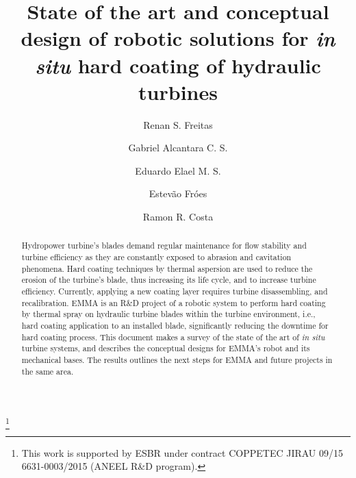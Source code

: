 \documentclass[twocolumn]{svjour3}
\begin{document}

\title{State of the art and conceptual design of robotic solutions for
\textit{in situ} hard coating of hydraulic turbines}%



\author{Renan S. Freitas \and
		Gabriel Alcantara C. S. \and
		Eduardo Elael M. S. \and
		Estevão Fróes \and
		Ramon R. Costa}


\thanks{This work is supported by ESBR under contract COPPETEC
JIRAU 09/15 6631-0003/2015 (ANEEL R\&D program).}

\maketitle
  
\begin{abstract}      
Hydropower turbine's blades demand regular maintenance for flow stability and
turbine efficiency as they are constantly exposed to abrasion and cavitation
phenomena. Hard coating techniques by thermal aspersion are used to reduce the
erosion of the turbine's blade, thus increasing its life cycle, and to increase
turbine efficiency. Currently, applying a new coating layer requires turbine
disassembling, and recalibration. EMMA is an R\&D project of a robotic system
to perform hard coating by thermal spray on hydraulic turbine blades within the
turbine environment, i.e., hard coating application to an installed blade,
significantly reducing the downtime for hard coating process.
This document makes a survey of the state of the art of \textit{in situ}
turbine systems, and describes the conceptual designs for EMMA's robot and its
mechanical bases. The results outlines the next steps for EMMA and future
projects in the same area.

\end{abstract} 

 





  
 
\end{document}
